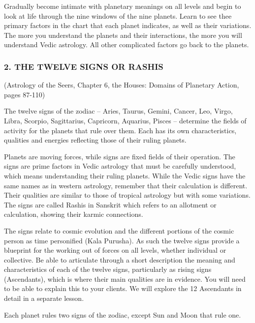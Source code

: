 Gradually become intimate with planetary meanings on all levels and begin to look at life through the nine windows of the nine planets. Learn to see thee primary factors in the chart that each planet indicates, as well as their variations. The more you understand the planets and their interactions, the more you will understand Vedic astrology. All other complicated factors go back to the planets.

 

\subsubsection{2. THE TWELVE SIGNS OR RASHIS} (Astrology of the Seers, Chapter 6, the Houses: Domains of Planetary Action, pages 87-110)
 

The twelve signs of the zodiac – Aries, Taurus, Gemini, Cancer, Leo, Virgo, Libra, Scorpio, Sagittarius, Capricorn, Aquarius, Pisces – determine the fields of activity for the planets that rule over them. Each has its own characteristics, qualities and energies reflecting those of their ruling planets.

 

Planets are moving forces, while signs are fixed fields of their operation. The signs are prime factors in Vedic astrology that must be carefully understood, which means understanding their ruling planets. While the Vedic signs have the same names as in western astrology, remember that their calculation is different. Their qualities are similar to those of tropical astrology but with some variations. The signs are called Rashis in Sanskrit which refers to an allotment or calculation, showing their karmic connections.

 

The signs relate to cosmic evolution and the different portions of the cosmic person as time personified (Kala Purusha). As such the twelve signs provide a blueprint for the working out of forces on all levels, whether individual or collective. Be able to articulate through a short description the meaning and characteristics of each of the twelve signs, particularly as rising signs (Ascendants), which is where their main qualities are in evidence. You will need to be able to explain this to your clients. We will explore the 12 Ascendants  in detail in a separate lesson.

 

Each planet rules two signs of the zodiac, except Sun and Moon that rule one.


